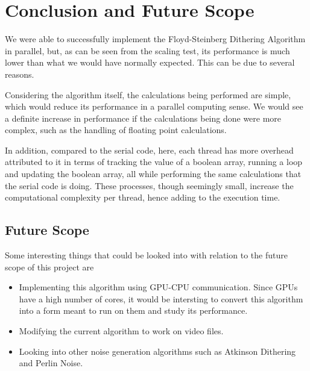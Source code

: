 \documentclass{article}
\begin{document}
\section{Conclusion and Future Scope}

We were able to successfully implement the Floyd-Steinberg Dithering Algorithm in parallel, but, as can be seen from the scaling test, its performance is much lower than what we would have normally expected. This can be due to several reasons.

\medskip
\noindent  Considering the algorithm itself, the calculations being performed are simple, which would reduce its performance in a parallel computing sense. We would see a definite increase in performance if the calculations being done were more complex, such as the handling of floating point calculations.

\medskip
\noindent In addition, compared to the serial code, here, each thread has more overhead attributed to it in terms of tracking the value of a boolean array, running a loop and updating the boolean array, all while performing the same calculations that the serial code is doing. These processes, though seemingly small, increase the computational complexity per thread, hence adding to the execution time.

\subsection{Future Scope}

Some interesting things that could be looked into with relation to the future scope of this project are

\begin{itemize}
    \item Implementing this algorithm using GPU-CPU communication\cite{Hartley}. Since GPUs have a high number of cores, it would be intersting to convert this algorithm into a form meant to run on them and study its performance.

    \item Modifying the current algorithm to work on video files.

    \item Looking into other noise generation algorithms such as Atkinson Dithering and Perlin Noise.

\end{itemize}

\printbibliography[title={References}]
\end{document}

